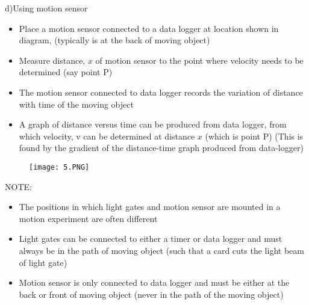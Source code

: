 \documentclass{article}
\begin{document}
\begin{enumerate}
    \begin{flushleft}
    d)Using motion sensor 
    \end{flushleft}
    \begin{itemize}
        \item Place a motion sensor connected to a data logger at location shown in diagram,
(typically is at the back of moving object)
\item Measure distance, $x$ of motion sensor to the point where velocity needs to be
determined (say point P)
\item The motion sensor connected to data logger records the variation of distance with time
of the moving object
\item A graph of distance versus time can be produced from data logger, from which
velocity, v can be determined at distance $x$ (which is point P)
(This is found by the gradient of the distance-time graph produced from data-logger)
    \end{itemize}
    \begin{figure}[H]
        \centering
        \texttt{[image: 5.PNG]}
    \end{figure}
    \begin{flushleft}
    NOTE:
    \end{flushleft}
    \begin{itemize}
        \item The positions in which light gates and motion sensor are mounted in a motion
experiment are often different
\item Light gates can be connected to either a timer or data logger and must always be in
the path of moving object (such that a card cuts the light beam of light gate)
\item  Motion sensor is only connected to data logger and must be either at the back or front
of moving object (never in the path of the moving object)
    \end{itemize}
 

\end{enumerate}
\end{document}
